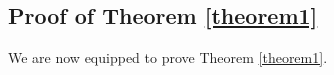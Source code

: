 \documentclass{amsart}
\newtheorem{proposition}{Proposition}
\theoremstyle{definition}
\theoremstyle{remark}
\begin{document}






\subsection{Proof of Theorem \ref{theorem1}}

We are now equipped to prove Theorem \ref{theorem1}.
\end{document}
